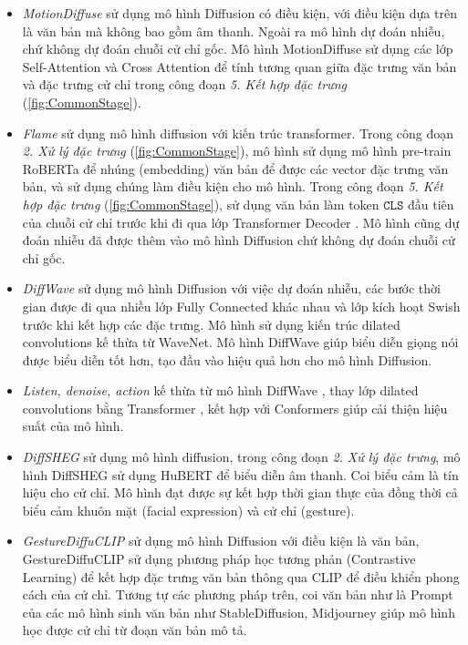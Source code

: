 \begin{itemize}
	\item \textit{MotionDiffuse} \cite{zhang2022motiondiffuse} sử dụng mô hình Diffusion có điều kiện, với điều kiện dựa trên là văn bản mà không bao gồm âm thanh. Ngoài ra mô hình dự đoán nhiễu, chứ không dự đoán chuỗi cử chỉ gốc. Mô hình MotionDiffuse sử dụng các lớp Self-Attention và Cross Attention để tính tương quan giữa đặc trưng văn bản và đặc trưng cử chỉ trong công đoạn \textit{5. Kết hợp đặc trưng} (\autoref{fig:CommonStage}).
	
	\item \textit{Flame} \cite{kim2023flame} sử dụng mô hình diffusion với kiến trúc transformer. Trong công đoạn \textit{2. Xử lý đặc trưng} (\autoref{fig:CommonStage}), mô hình sử dụng mô hình pre-train RoBERTa để nhúng (embedding) văn bản để được các vector đặc trưng văn bản, và sử dụng chúng làm điều kiện cho mô hình. 
	Trong công đoạn \textit{5. Kết hợp đặc trưng} (\autoref{fig:CommonStage}), sử dụng văn bản làm token $\texttt{CLS}$ đầu tiên của chuỗi cử chỉ trước khi đi qua lớp Transformer Decoder .  Mô hình cũng dự đoán nhiễu đã được thêm vào mô hình Diffusion chứ không dự đoán chuỗi cử chỉ gốc.
	
	\item \textit{DiffWave} \cite{kong2020diffwave} sử dụng mô hình Diffusion với việc dự đoán nhiễu, các bước thời gian được đi qua nhiều lớp Fully Connected khác nhau và lớp kích hoạt Swish trước khi kết hợp các đặc trưng. Mô hình sử dụng kiến trúc dilated convolutions kế thừa từ WaveNet. Mô hình DiffWave giúp biểu diễn giọng nói được biểu diễn tốt hơn, tạo đầu vào hiệu quả hơn cho mô hình Diffusion.
	
	\item \textit{Listen, denoise, action} \cite{alexanderson2022listen} kế thừa từ mô hình DiffWave \cite{kong2020diffwave}, thay lớp dilated convolutions bằng Transformer , kết hợp với Conformers giúp cải thiện hiệu suất của mô hình.
	
	\item \textit{DiffSHEG} \cite{chen2024diffsheg} sử dụng mô hình diffusion, trong công đoạn \textit{2. Xử lý đặc trưng}, mô hình DiffSHEG sử dụng HuBERT để biểu diễn âm thanh. Coi biểu cảm là tín hiệu cho cử chỉ. Mô hình đạt được sự kết hợp thời gian thực của đồng thời cả biểu cảm khuôn mặt (facial expression) và cử chỉ (gesture).
	
	\item \textit{GestureDiffuCLIP} \cite{ao2023gesturediffuclip} sử dụng mô hình Diffusion với điều kiện là văn bản, GestureDiffuCLIP sử dụng phương pháp học tương phản (Contrastive Learning) để kết hợp đặc trưng văn bản thông qua CLIP để điều khiển phong cách của cử chỉ. Tương tự các phương pháp trên, coi văn bản như là Prompt của các mô hình sinh văn bản như StableDiffusion, Midjourney giúp mô hình học được cử chỉ từ đoạn văn bản mô tả.
	

\end{itemize}

